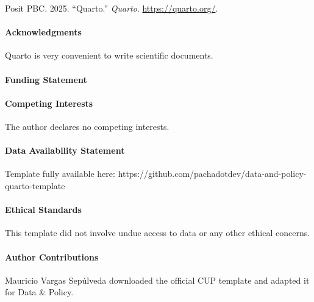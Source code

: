 \documentclass{latex/CUP-JNL-DAP}%
\newlength{\cslhangindent}
\newenvironment{CSLReferences}[2] %
 {\begin{list}{}{%
  \setlength{\itemindent}{0pt}
  \setlength{\leftmargin}{0pt}
  \setlength{\parsep}{0pt}
  \ifodd #1
   \setlength{\leftmargin}{\cslhangindent}
   \setlength{\itemindent}{-1\cslhangindent}
  \fi
  \setlength{\itemsep}{#2\baselineskip}}}
 {\end{list}}
\begin{document}
\label{refs}
\begin{CSLReferences}{1}{0}
Posit PBC. 2025. {``Quarto.''} \emph{Quarto}. \url{https://quarto.org/}.

\end{CSLReferences}

\begin{Backmatter}

\paragraph{Acknowledgments}
Quarto is very convenient to write scientific documents.

\paragraph{Funding Statement}


\paragraph{Competing Interests}
The author declares no competing interests.

\paragraph{Data Availability Statement}
Template fully available here:
https://github.com/pachadotdev/data-and-policy-quarto-template

\paragraph{Ethical Standards}
This template did not involve undue access to data or any other ethical
concerns.

\paragraph{Author Contributions}
Mauricio Vargas Sepúlveda downloaded the official CUP template and
adapted it for Data \& Policy.



% 


\end{Backmatter}
\end{document}
